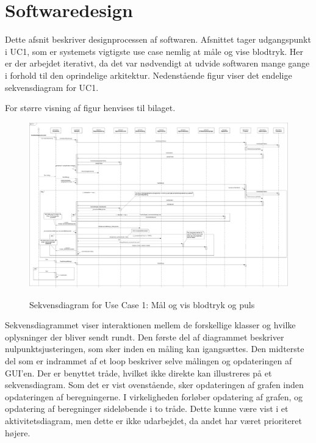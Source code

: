 \clearpage

\section{Softwaredesign}
Dette afsnit beskriver designprocessen af softwaren. Afsnittet tager udgangspunkt i UC1, som er systemets vigtigste use case nemlig at måle og vise blodtryk. Her er der arbejdet iterativt, da det var nødvendigt at udvide softwaren mange gange i forhold til den oprindelige arkitektur. Nedenstående figur viser det endelige sekvensdiagram for UC1.

For større visning af figur henvises til bilaget. 

\vspace{0.5 cm}
\begin{figure}[h!]
	\centering
	\includegraphics[width=1\linewidth]{Arkitektur_og_design/Softwarearkitektur/sekvensdiagram}
	\label{fig:sekvensdiagram}
	\caption{Sekvensdiagram for Use Case 1: Mål og vis blodtryk og puls}
\end{figure}
\vspace{0.5 cm}

Sekvensdiagrammet viser interaktionen mellem de forskellige klasser og hvilke oplysninger der bliver sendt rundt. Den første del af diagrammet beskriver nulpunktsjusteringen, som sker inden en måling kan igangsættes. Den midterste del som er indrammet af et loop beskriver selve målingen og opdateringen af GUI’en.  Der er benyttet tråde, hvilket ikke direkte kan illustreres på et sekvensdiagram. Som det er vist ovenstående, sker opdateringen af grafen inden opdateringen af beregningerne. I virkeligheden forløber opdatering af grafen, og opdatering af beregninger sideløbende i to tråde. Dette kunne være vist i et aktivitetsdiagram, men dette er ikke udarbejdet, da andet har været prioriteret højere. 

